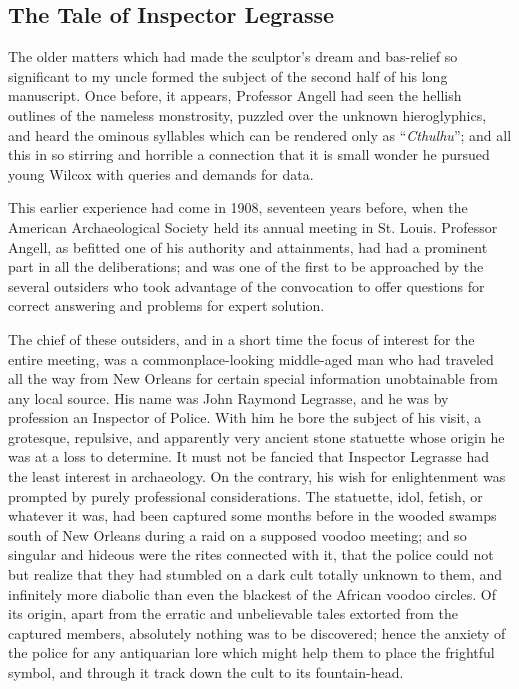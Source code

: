 \begin{pages}
    \begin{Leftside}
        \beginnumbering
            \pstart

\chapter*{The Tale of Inspector Legrasse}

\noindent{}The older matters which had made the sculptor's dream and bas-relief so
significant to my uncle formed the subject of the second half of his
long manuscript. Once before, it appears, Professor Angell had seen the
hellish outlines of the nameless monstrosity, puzzled over the unknown
hieroglyphics, and heard the ominous syllables which can be rendered
only as ``\emph{Cthulhu}''; and all this in so stirring and horrible a
connection that it is small wonder he pursued young Wilcox with queries
and demands for data.

This earlier experience had come in 1908, seventeen years before, when
the American Archaeological Society held its annual meeting in St.
Louis. Professor Angell, as befitted one of his authority and
attainments, had had a prominent part in all the deliberations; and was
one of the first to be approached by the several outsiders who took
advantage of the convocation to offer questions for correct answering
and problems for expert solution.

The chief of these outsiders, and in a short time the focus of interest
for the entire meeting, was a commonplace-looking middle-aged man who
had traveled all the way from New Orleans for certain special
information unobtainable from any local source. His name was John
Raymond Legrasse, and he was by profession an Inspector of Police. With
him he bore the subject of his visit, a grotesque, repulsive, and
apparently very ancient stone statuette whose origin he was at a loss to
determine. It must not be fancied that Inspector Legrasse had the least
interest in archaeology. On the contrary, his wish for enlightenment was
prompted by purely professional considerations. The statuette, idol,
fetish, or whatever it was, had been captured some months before in the
wooded swamps south of New Orleans during a raid on a supposed voodoo
meeting; and so singular and hideous were the rites connected with it,
that the police could not but realize that they had stumbled on a dark
cult totally unknown to them, and infinitely more diabolic than even the
blackest of the African voodoo circles. Of its origin, apart from the
erratic and unbelievable tales extorted from the captured members,
absolutely nothing was to be discovered; hence the anxiety of the police
for any antiquarian lore which might help them to place the frightful
symbol, and through it track down the cult to its fountain-head.


\end{Leftside}
\end{pages}
